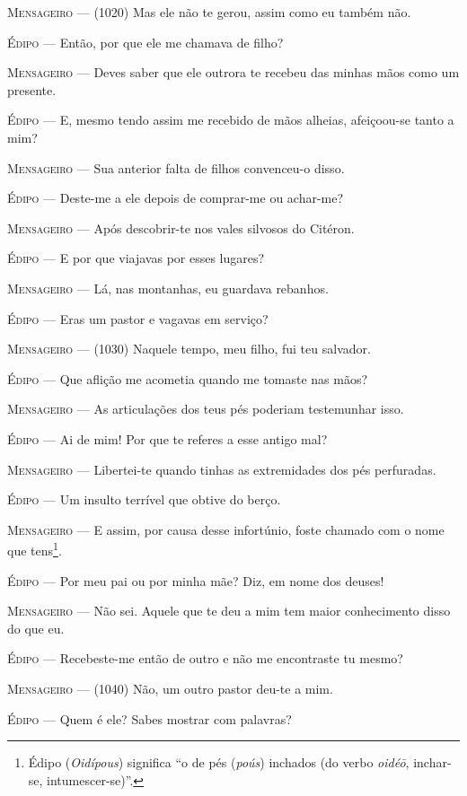 \textsc{Mensageiro} --- (1020) Mas ele não te gerou, assim como eu também não.

\textsc{Édipo} --- Então, por que ele me chamava de filho?

\textsc{Mensageiro} --- Deves saber que ele outrora te recebeu das minhas mãos como um presente.

\textsc{Édipo} --- E, mesmo tendo assim me recebido de mãos alheias, afeiçoou-se tanto a
mim?

\textsc{Mensageiro} --- Sua anterior falta de filhos convenceu-o disso.

\textsc{Édipo} --- Deste-me a ele depois de comprar-me ou achar-me?

\textsc{Mensageiro} --- Após descobrir-te nos vales silvosos do Citéron.

\textsc{Édipo} --- E por que viajavas por esses lugares?

\textsc{Mensageiro} --- Lá, nas montanhas, eu guardava rebanhos.

\textsc{Édipo} --- Eras um pastor e vagavas em serviço?

\textsc{Mensageiro} --- (1030) Naquele tempo, meu filho, fui teu salvador.

\textsc{Édipo} --- Que aflição me acometia quando me tomaste nas mãos?

\textsc{Mensageiro} --- As articulações dos teus pés poderiam testemunhar isso.

\textsc{Édipo} --- Ai de mim! Por que te referes a esse antigo mal?

\textsc{Mensageiro} --- Libertei-te quando tinhas as extremidades dos pés perfuradas.

\textsc{Édipo} --- Um insulto terrível que obtive do berço.

\textsc{Mensageiro} --- E assim, por causa desse infortúnio, foste chamado com o nome que
tens\footnote{Édipo (\emph{Oidípous}) significa ``o de pés (\emph{poús})
  inchados (do verbo \emph{oidéō}, inchar-se, intumescer-se)''.}.

\textsc{Édipo} --- Por meu pai ou por minha mãe? Diz, em nome dos deuses!

\textsc{Mensageiro} --- Não sei. Aquele que te deu a mim tem maior conhecimento disso do que eu.

\textsc{Édipo} --- Recebeste-me então de outro e não me encontraste tu mesmo?

\textsc{Mensageiro} --- (1040) Não, um outro pastor deu-te a mim.

\textsc{Édipo} --- Quem é ele? Sabes mostrar com palavras?

